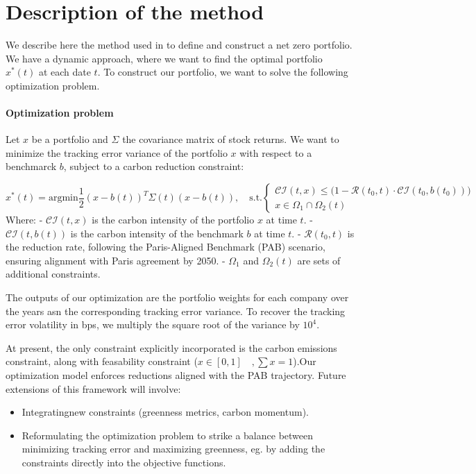 \section{Description of the method}
We describe here the method used in \citep{barahhou2022netzero} to define and construct a net zero portfolio. We have a dynamic approach, where we want to find the optimal portfolio $x^*(t)$ at each date $t$.
To construct our portfolio, we want to solve the following optimization problem.

\paragraph{Optimization problem}
Let $x$ be a portfolio and $\Sigma$ the covariance matrix of stock returns. We want to minimize the tracking error variance of the portfolio $x$ with respect to a benchmarck $b$, subject to a carbon reduction constraint:

\begin{equation}
    x^*(t) = 
    \text{argmin} \frac{1}{2}(x - b(t))^T \Sigma (t)(x - b(t)), \quad
    \text{s.t.} 
    \begin{cases}
        \mathcal{CI}(t, x) \leq \big(1 - \mathcal{R}(t_0, t) \cdot \mathcal{CI}(t_0, b(t_0))\big) \\
        x \in \Omega_1\cap \Omega_2(t)
    \end{cases}
\end{equation}
Where:  
- $\mathcal{CI}(t, x)$ is the carbon intensity of the portfolio $x$ at time $t$.  
- $\mathcal{CI}(t, b(t))$ is the carbon intensity of the benchmark $b$ at time $t$.  
- $\mathcal{R}(t_0, t)$ is the reduction rate, following the Paris-Aligned Benchmark (PAB) scenario, ensuring alignment with Paris agreement by 2050.  
- $\Omega_1$ and $\Omega_2(t)$ are sets of additional constraints.

The outputs of our optimization are the portfolio weights for each company over the years asn the corresponding tracking error variance. To recover the tracking error volatility in bps, we multiply the square root of the variance by $10^4$.

At present, the only constraint explicitly incorporated is the carbon emissions constraint, along with feasability constraint ($ x \in [0,1] \quad, \sum x = 1$).Our optimization model enforces reductions aligned with the PAB trajectory. Future extensions of this framework will involve:  
\begin{itemize}
    \item Integratingnew constraints (greenness metrics, carbon momentum).
    \item Reformulating the optimization problem to strike a balance between minimizing tracking error and maximizing greenness, eg. by adding the constraints directly into the objective functions.
\end{itemize}

